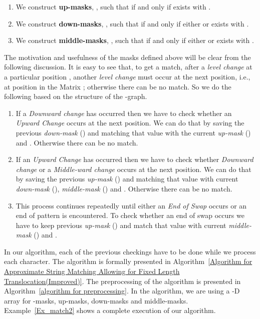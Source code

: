 \documentclass{llncs}
\begin{document}
{\begin{enumerate}
\item We construct \textbf{up-masks}, ,  such that  if and only if  exists with . 


\item We construct \textbf{down-masks}, ,  such that  if and only if either  or  exists with .  


\item We construct \textbf{middle-masks}, ,  such that  if and only if either  or  exists with .

\end{enumerate}




The motivation and usefulness of the  masks defined above will be clear from the following discussion.
It is easy to see that, to get a match, after a \emph{level change} at a particular position , another \emph{level change} must occur at the next position, i.e., at position  in the Matrix ; otherwise there can be no match. So we do the following based on the structure of the -graph.


\begin{enumerate}

\item If a \emph{Downward change} has occurred  then we have to check whether an \emph{Upward Change} occurs at the next position. We can do that by saving the previous \emph{down-mask} () and matching that value with the current \emph{up-mask} () and . Otherwise there can be no match.


\item If an \emph{Upward Change} has occurred then we have to check whether \emph{Downward change} or a \emph{Middle-ward change} occurs at the next position. We can do that by saving the previous \emph{up-mask} () and matching that value with current \emph{down-mask}  (), \emph{middle-mask} () and . Otherwise there can be no match.


\item This process continues repeatedly until either an \emph{End of Swap} occurs or an end of pattern is encountered. To check whether an end of swap occurs we have to keep previous \emph{up-mask} () and match that value with current \emph{middle-mask} () and . 
\end{enumerate}  




In our algorithm, each of the previous checkings have to be done while we process each character. The algorithm is formally presented in Algorithm~\ref{Algorithm for Approximate String Matching Allowing for Fixed Length Translocation(Improved)}. The preprocessing of the algorithm is presented in Algorithm~\ref{algorithm for preprocessing}. In the algorithm, we are using a -D array for -masks, up-masks, down-masks and middle-masks. Example~\ref{Ex_match2} shows a complete execution of our algorithm.

}
\end{document}
